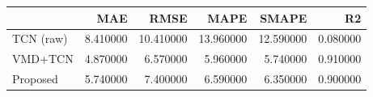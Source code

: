 \begin{tabular}{lrrrrr}
\toprule
 & MAE & RMSE & MAPE & SMAPE & R2 \\
\midrule
TCN (raw) & 8.410000 & 10.410000 & 13.960000 & 12.590000 & 0.080000 \\
VMD+TCN & 4.870000 & 6.570000 & 5.960000 & 5.740000 & 0.910000 \\
Proposed & 5.740000 & 7.400000 & 6.590000 & 6.350000 & 0.900000 \\
\bottomrule
\end{tabular}
